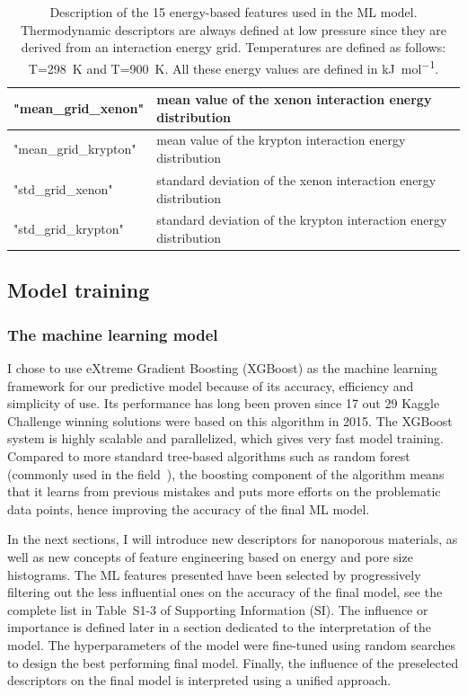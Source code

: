 \documentclass[main]{subfiles}
\begin{document}
\begin{table}[ht]
\begin{tabular}{|l|m{13cm}|}
  \hline
  "mean\_grid\_xenon"  & mean value of the xenon interaction energy distribution \\
  \hline
  "mean\_grid\_krypton"  & mean value of the krypton interaction energy distribution \\
  \hline
  "std\_grid\_xenon"  & standard deviation of the xenon interaction energy distribution \\
  \hline
  "std\_grid\_krypton"  & standard deviation of the krypton interaction energy distribution \\
  \hline
  \end{tabular}
  \caption{Description of the 15 energy-based features used in the ML model. Thermodynamic descriptors are always defined at low pressure since they are derived from an interaction energy grid. Temperatures are defined as follows: T=298~\si{\kelvin} and T=900~\si{\kelvin}. All these energy values are defined in \si{\kilo\joule\per\mole}.}\label{tab:energy_descriptors}
  \end{table}
  
  \clearpage

\subsection{Model training}

\subsubsection{The machine learning model}

I chose to use eXtreme Gradient Boosting (XGBoost) as the machine learning framework for our predictive model because of its accuracy, efficiency and simplicity of use. Its performance has long been proven since 17 out 29 Kaggle Challenge winning solutions were based on this algorithm in 2015. The XGBoost system is highly scalable and parallelized, which gives very fast model training.\autocite{chen2016xgboost} Compared to more standard tree-based algorithms such as random forest (commonly used in the field~\autocite{Simon_2015}), the boosting component of the algorithm means that it learns from previous mistakes and puts more efforts on the problematic data points, hence improving the accuracy of the final ML model.

In the next sections, I will introduce new descriptors for nanoporous materials, as well as new concepts of feature engineering based on energy and pore size histograms. The ML features presented have been selected by progressively filtering out the less influential ones on the accuracy of the final model, see the complete list in Table~S1-3 of Supporting Information (SI). The influence or importance is defined later in a section dedicated to the interpretation of the model. The hyperparameters of the model were fine-tuned using random searches to design the best performing final model. Finally, the influence of the preselected descriptors on the final model is interpreted using a unified approach.
\end{document}
